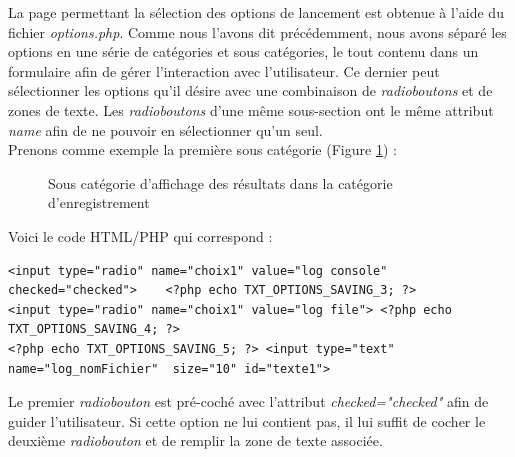 La page permettant la sélection des options de lancement est obtenue à l'aide du fichier \emph{options.php}. Comme nous l'avons dit précédemment, nous avons séparé les options en une série de catégories et sous catégories, le tout contenu dans un formulaire afin de gérer l'interaction avec l'utilisateur. Ce dernier peut sélectionner les options qu'il désire avec une combinaison de \textit{radioboutons} et de zones de texte. Les \textit{radioboutons} d'une même sous-section ont le même attribut \textit{name} afin de ne pouvoir en sélectionner qu'un seul. \\

Prenons comme exemple la première sous catégorie (Figure \ref{affichageResults}) :

\begin{figure}[!ht]
	\begin{center}
		\caption{Sous catégorie d'affichage des résultats dans la catégorie d'enregistrement}
  		\label{affichageResults}
  	\end{center}	
\end{figure}

Voici le code HTML/PHP qui correspond :

\scriptsize
\begin{DDbox}{\linewidth}
\begin{lstlisting}
<input type="radio" name="choix1" value="log console" checked="checked">	<?php echo TXT_OPTIONS_SAVING_3; ?> 
<input type="radio" name="choix1" value="log file"> <?php echo TXT_OPTIONS_SAVING_4; ?> 
<?php echo TXT_OPTIONS_SAVING_5; ?> <input type="text"	 name="log_nomFichier" 	size="10" id="texte1">
\end{lstlisting}
\end{DDbox}

\normalsize

Le premier \textit{radiobouton} est pré-coché avec l'attribut \textit{checked="checked"} afin de guider l'utilisateur. Si cette option ne lui contient pas, il lui suffit de cocher le deuxième \textit{radiobouton} et de remplir la zone de texte associée. \\

